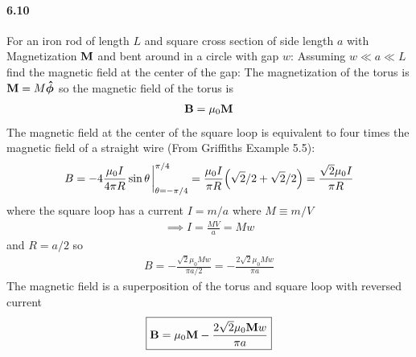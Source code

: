 \documentclass[../main.tex]{subfiles}
\begin{document}
\paragraph{6.10} For an iron rod of length $L$ and square cross section of side length $a$ with Magnetization $\vb M$ and bent around
in a circle with gap $w$: Assuming $w \ll a \ll L$ find the magnetic field at the center of the gap:
The magnetization of the torus is $\vb M = M \vu*\phi$ so the magnetic field
of the torus is
\begin{align*}
    \vb B = \mu_0 \vb M
\end{align*}
The magnetic field at the center of the square loop is equivalent to four times the magnetic field of a straight wire (From Griffiths Example 5.5):
\begin{align*}
    B = -4 \frac{\mu_0 I}{4\pi R} \sin\theta \eval_{\theta = -\pi/4}^{\pi/4} = \frac{\mu_0 I}{\pi R} \qt(\sqrt{2}/2 + \sqrt{2}/2) = \frac{\sqrt{2}\mu_0 I}{\pi R}
\end{align*}
where the square loop has a current $I = m / a$ where $M \equiv m / V$
\begin{align*}
    \implies I = \frac{MV}{a} = M w
\end{align*}
and $R = a / 2$ so
\begin{align*}
    B = -\frac{\sqrt{2}\mu_0 M w}{\pi a / 2} = -\frac{2\sqrt{2}\mu_0 M w}{\pi a}
\end{align*}
The magnetic field is a superposition of the torus and square loop with reversed current
\begin{align*}
    \boxed{
        \vb B = \mu_0 \vb M - \frac{2\sqrt{2}\mu_0 \vb M w}{\pi a}
    }
\end{align*}

\newpage
\end{document}
